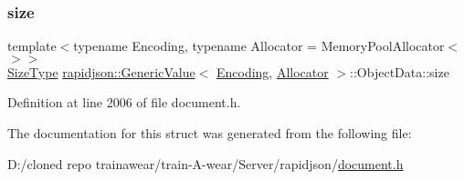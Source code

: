 \subsubsection{\texorpdfstring{size}{size}}
{\footnotesize\ttfamily template$<$typename Encoding, typename Allocator = Memory\+Pool\+Allocator$<$$>$$>$ \\
\mbox{\hyperlink{namespacerapidjson_a44eb33eaa523e36d466b1ced64b85c84}{Size\+Type}} \mbox{\hyperlink{classrapidjson_1_1_generic_value}{rapidjson\+::\+Generic\+Value}}$<$ \mbox{\hyperlink{classrapidjson_1_1_encoding}{Encoding}}, \mbox{\hyperlink{classrapidjson_1_1_allocator}{Allocator}} $>$\+::Object\+Data\+::size}



Definition at line 2006 of file document.\+h.



The documentation for this struct was generated from the following file\+:\begin{DoxyCompactItemize}
\item 
D\+:/cloned repo trainawear/train-\/\+A-\/wear/\+Server/rapidjson/\mbox{\hyperlink{document_8h}{document.\+h}}\end{DoxyCompactItemize}
